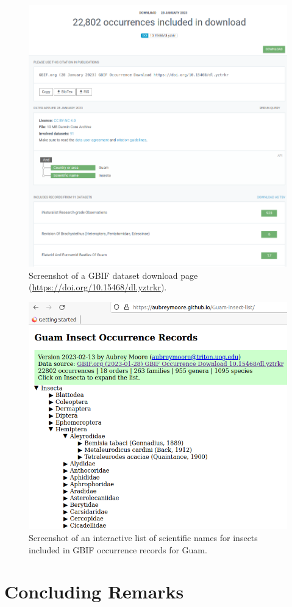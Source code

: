\documentclass[12pt,letterpaper,english,bibliography=totocnumbered, abstract=on]{scrartcl}
\begin{document}
\begin{figure}[h]
	\centering
	\includegraphics[width=\linewidth]{images/dataset-download}
	\caption{Screenshot of a GBIF dataset download page (\url{https://doi.org/10.15468/dl.yztrkr}).}
	\label{fig:dataset-download}
\end{figure}



\begin{figure}[h]
	\centering
	\includegraphics[width=\linewidth]{images/guam-insect-occurrence-records}
	\caption{Screenshot of an interactive list of scientific names for insects included in GBIF occurrence records for Guam.}
	\label{fig:guam-insect-occurrence-records}
\end{figure}

\clearpage



\pagebreak
\section{Concluding Remarks}
\end{document}
